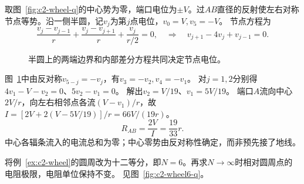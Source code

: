 \begin{solution}
取图~\ref{fig:c2-wheel-q}的中心势为零，端口电位为$\pm V$。过$AB$直径的反射使左右对称节点等势。沿一侧半圆，记$v_j$为第$j$点电位，$v_0=V,v_5=-V$。
节点方程为
\[
 \frac{v_j-v_{j-1}}r+\frac{v_j-v_{j+1}}r+\frac{v_j}{r/2}=0,
 \quad\Rightarrow\quad v_{j+1}-4v_j+v_{j-1}=0.
\]

\begin{figure}[H]\centering
{}
\caption{半圆上的两端边界和内部差分方程共同决定节点电位。}\label{fig:c2-wheel-s}
\end{figure}

图~\ref{fig:c2-wheel-s}中由反对称$v_{5-j}=-v_j$，有$v_3=-v_2,v_4=-v_1$。
对$j=1,2$分别得$4v_1-V-v_2=0$、$5v_2-v_1=0$。
解出$v_2=V/19$、$v_1=5V/19$。
端口$A$流向中心$2V/r$，向左右相邻点各流$(V-v_1)/r$，故
$I=[2V+2(V-5V/19)]/r=66V/(19r)$。
\[
 \boxed{R_{AB}=\frac{2V}I=\frac{19}{33}r}.
\]
中心各辐条流入的电流总和为零；中心零势由反对称性确定，而非预先接了地线。
\end{solution}

\begin{example}[六条直径与无限圆周极限]\label{ex:c2-wheel6}
将例~\ref{ex:c2-wheel}的圆周改为十二等分，即$N=6$。再求$N\to\infty$时相对圆周点的电阻极限，电阻单位保持不变。 见图~\ref{fig:c2-wheel6-q}。
\end{example}

